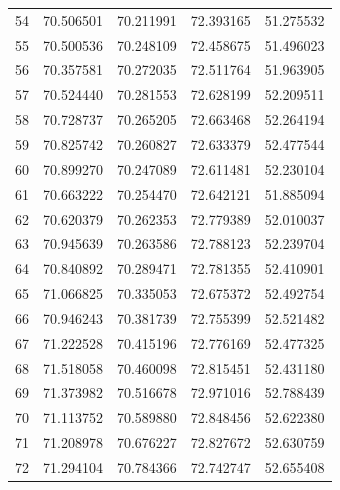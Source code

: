\begin{table}
\begin{tabular}{rrrrr}
54 & 70.506501 & 70.211991 & 72.393165 & 51.275532 \\
55 & 70.500536 & 70.248109 & 72.458675 & 51.496023 \\
56 & 70.357581 & 70.272035 & 72.511764 & 51.963905 \\
57 & 70.524440 & 70.281553 & 72.628199 & 52.209511 \\
58 & 70.728737 & 70.265205 & 72.663468 & 52.264194 \\
59 & 70.825742 & 70.260827 & 72.633379 & 52.477544 \\
60 & 70.899270 & 70.247089 & 72.611481 & 52.230104 \\
61 & 70.663222 & 70.254470 & 72.642121 & 51.885094 \\
62 & 70.620379 & 70.262353 & 72.779389 & 52.010037 \\
63 & 70.945639 & 70.263586 & 72.788123 & 52.239704 \\
64 & 70.840892 & 70.289471 & 72.781355 & 52.410901 \\
65 & 71.066825 & 70.335053 & 72.675372 & 52.492754 \\
66 & 70.946243 & 70.381739 & 72.755399 & 52.521482 \\
67 & 71.222528 & 70.415196 & 72.776169 & 52.477325 \\
68 & 71.518058 & 70.460098 & 72.815451 & 52.431180 \\
69 & 71.373982 & 70.516678 & 72.971016 & 52.788439 \\
70 & 71.113752 & 70.589880 & 72.848456 & 52.622380 \\
71 & 71.208978 & 70.676227 & 72.827672 & 52.630759 \\
72 & 71.294104 & 70.784366 & 72.742747 & 52.655408 \\
\bottomrule
\end{tabular}
\end{table}
